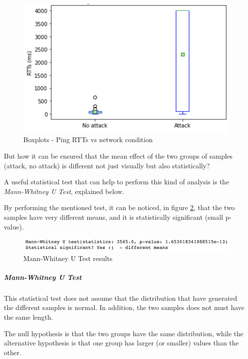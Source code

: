 \documentclass[fleqn, 11pt]{SelfArx} %
\begin{document}
\begin{figure}[H]
	\centering
    \includegraphics[width=\linewidth]{./ping/ping-boxplot1.png}
    \caption{Boxplots - Ping RTTs vs network condition}
	\label{fig:ping-boxplot1}%
\end{figure}

But how it can be ensured that the mean effect of the two groups of samples (attack, no attack) is different not just visually but also statistically\mbox{?}

A useful statistical test that can help to perform this kind of analysis is the {\it{Mann-Whitney U Test}}, explained below. \newline

By performing the mentioned test, it can be noticed, in figure \ref{fig:mannwhitneyu1}, that the two samples have very different means, and it is statistically significant (small p-value).

\begin{figure}[H]\centering
    \includegraphics[width=\linewidth]{./ping/mannwhitneyu1.png}
    \caption{Mann-Whitney U Test results}
	\label{fig:mannwhitneyu1}
\end{figure}

\subparagraph{Mann-Whitney U Test \cite{MannWhitneyU}}
This statistical test does not assume that the distribution that have generated the different samples is normal.
In addition, the two samples does not must have the same length.

The null hypothesis is that the two groups have the same distribution, while the alternative hypothesis is that one group has larger (or smaller) values than the other.\\
\end{document}
